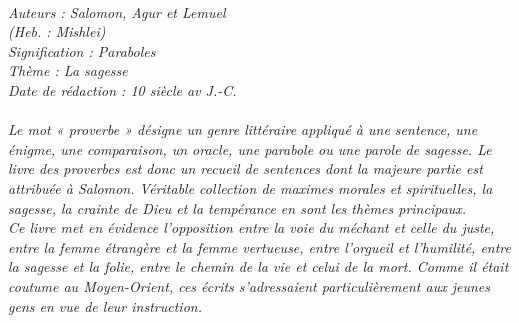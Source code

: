 \BFont
\noindent\hrulefill
{\footnotesize
\textit{
\bigskip
{\centering{}
\\Auteurs : Salomon, Agur et Lemuel
\\(Heb. : Mishlei)
\\Signification : Paraboles
\\Thème : La sagesse
\\Date de rédaction : 10 siècle av J.-C.\\}
}
\textit{
\\Le mot « proverbe » désigne un genre littéraire appliqué à une sentence, une énigme, une comparaison, un oracle, une
parabole ou une parole de sagesse. Le livre des proverbes est donc un recueil de sentences dont la majeure partie
est attribuée à Salomon. Véritable collection de maximes morales et spirituelles, la sagesse, la crainte de Dieu et la
tempérance en sont les thèmes principaux.
\\Ce livre met en évidence l'opposition entre la voie du méchant et celle du juste, entre la femme étrangère et la femme
vertueuse, entre l'orgueil et l'humilité, entre la sagesse et la folie, entre le chemin de la vie et celui de la mort. Comme il était coutume au Moyen-Orient, ces écrits s'adressaient particulièrement aux jeunes gens en vue de leur instruction.\bigskip
}
}
\par\nobreak\noindent\hrulefill
